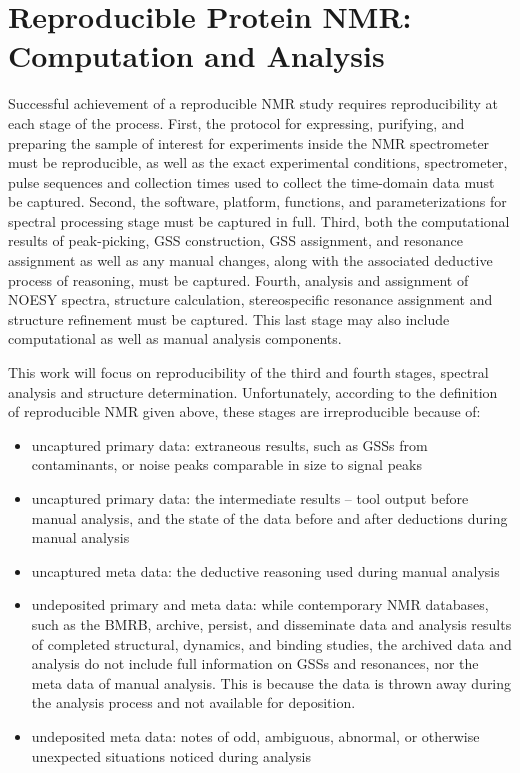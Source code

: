\section{Reproducible Protein NMR:  Computation and Analysis}
Successful achievement of a reproducible NMR study requires reproducibility at 
each stage of the process.  First, the protocol for expressing, purifying, and 
preparing the sample of interest for experiments inside the NMR spectrometer 
must be reproducible, as well as the exact experimental conditions, 
spectrometer, pulse sequences and collection times used to collect the 
time-domain data must be captured.  Second, the software, platform, functions, 
and parameterizations for spectral processing stage must be captured in full.  
Third, both the computational results of peak-picking, GSS construction,
GSS assignment, and resonance assignment as well as any manual changes, 
along with the associated deductive process of reasoning, must be captured.  
Fourth, analysis and assignment of NOESY spectra, structure calculation, 
stereospecific resonance assignment and structure refinement must be captured.  
This last stage may also include computational as well as manual analysis 
components.  

This work will focus on reproducibility of the third and fourth stages, 
spectral analysis and structure determination.  Unfortunately, according to 
the definition of reproducible NMR given above, these stages are irreproducible 
because of:
\begin{itemize}
  \item uncaptured primary data: extraneous results, such as GSSs from 
  contaminants, or noise peaks comparable in size to signal peaks
  \item uncaptured primary data: the intermediate results -- tool output before 
  manual analysis, and the state of the data before and after deductions during 
  manual analysis
  \item uncaptured meta data:  the deductive reasoning used during manual analysis
  \item undeposited primary and meta data: while contemporary NMR databases, 
  such as the BMRB, archive, persist, and disseminate data and analysis 
  results of completed structural, dynamics, and binding studies, the 
  archived data and analysis do not include full information on GSSs 
  and resonances, nor the meta data of manual analysis.  This is because the 
  data is thrown away during the analysis process and not available for deposition.
  \item undeposited meta data: notes of odd, ambiguous, abnormal, or 
  otherwise unexpected situations noticed during analysis
\end{itemize}

